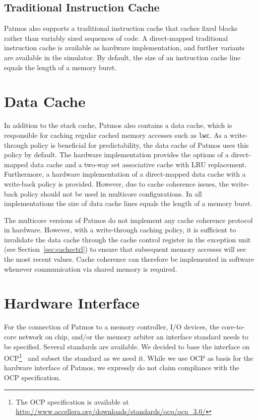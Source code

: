 \documentclass[a4paper,fontsize=10pt,twoside,DIV15,BCOR12mm,headinclude=true,footinclude=false,pagesize,bibtotoc]{scrbook}
\newcommand{\code}[1]{{\texttt{#1}}}
\begin{document}
\subsection{Traditional Instruction Cache}
\label{sec:line-cache}

Patmos also supports a traditional instruction cache that caches fixed
blocks rather than variably sized sequences of code. A direct-mapped
traditional instruction cache is available as hardware implementation,
and further variants are available in the simulator. By default, the
size of an instruction cache line equals the length of a memory burst.

\section{Data Cache}

In addition to the stack cache, Patmos also contains a data cache,
which is responsible for caching regular cached memory accesses such
as \code{lwc}. As a write-through policy is beneficial for
predictability, the data cache of Patmos uses this policy by
default. The hardware implementation provides the options of a
direct-mapped data cache and a two-way set associative cache with LRU
replacement. Furthermore, a hardware implementation of a direct-mapped
data cache with a write-back policy is provided. However, due to cache
coherence issues, the write-back policy should not be used in
multicore configurations. In all implementations the size of
data cache lines equals the length of a memory burst.

The multicore versions of Patmos do not implement any cache coherence
protocol in hardware. However, with a write-through caching policy, it
is sufficient to invalidate the data cache through the cache control
register in the exception unit (see Section~\ref{sec:cachectrl}) to
ensure that subsequent memory accesses will see the most recent
values. Cache coherence can therefore be implemented in software
whenever communication via shared memory is required.

\section{Hardware Interface}

For the connection of Patmos to a memory controller, I/O devices, the
core-to-core network on chip, and/or the memory arbiter an interface
standard needs to be specified. Several standards are available.  We
decided to base the interface on OCP\footnote{The OCP specification is
  available at \url{http://www.accellera.org/downloads/standards/ocp/ocp_3.0/}}~\cite{ocp:spec}
and subset the standard as we need it. While we use OCP as basis for
the hardware interface of Patmos, we expressly do not claim
compliance with the OCP specification.
\end{document}
